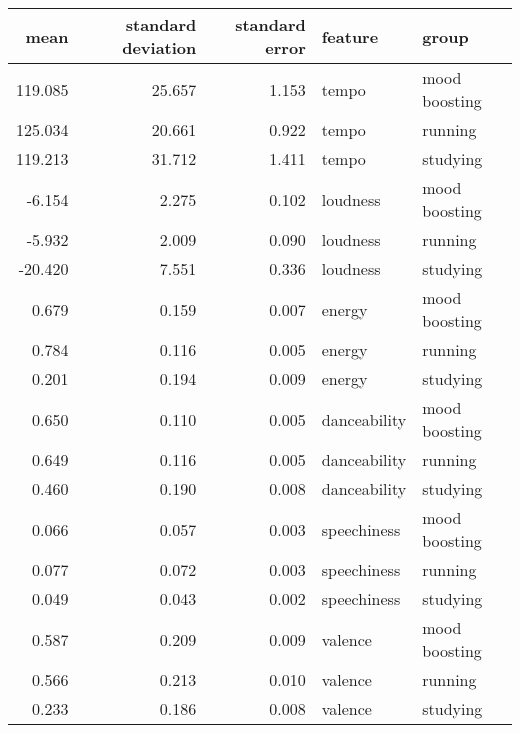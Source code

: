 \begin{tabular}{rrrll}
\toprule
   mean &  standard deviation &  standard error &      feature &         group \\
\midrule
119.085 &              25.657 &           1.153 &        tempo & mood boosting \\
125.034 &              20.661 &           0.922 &        tempo &       running \\
119.213 &              31.712 &           1.411 &        tempo &      studying \\
 -6.154 &               2.275 &           0.102 &     loudness & mood boosting \\
 -5.932 &               2.009 &           0.090 &     loudness &       running \\
-20.420 &               7.551 &           0.336 &     loudness &      studying \\
  0.679 &               0.159 &           0.007 &       energy & mood boosting \\
  0.784 &               0.116 &           0.005 &       energy &       running \\
  0.201 &               0.194 &           0.009 &       energy &      studying \\
  0.650 &               0.110 &           0.005 & danceability & mood boosting \\
  0.649 &               0.116 &           0.005 & danceability &       running \\
  0.460 &               0.190 &           0.008 & danceability &      studying \\
  0.066 &               0.057 &           0.003 &  speechiness & mood boosting \\
  0.077 &               0.072 &           0.003 &  speechiness &       running \\
  0.049 &               0.043 &           0.002 &  speechiness &      studying \\
  0.587 &               0.209 &           0.009 &      valence & mood boosting \\
  0.566 &               0.213 &           0.010 &      valence &       running \\
  0.233 &               0.186 &           0.008 &      valence &      studying \\
\bottomrule
\end{tabular}
